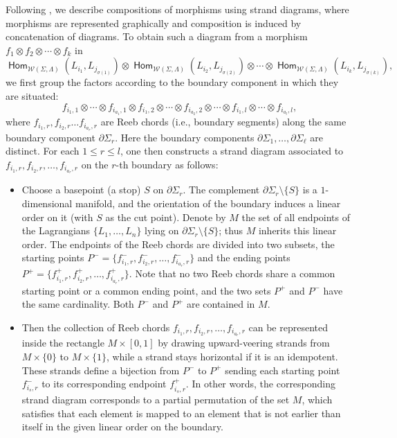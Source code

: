 \documentclass[a4paper, reqno, 11pt]{amsart}
\theoremstyle{definition}
\newcommand{\opname}[1]{\operatorname{\mathsf{#1}}}
\newcommand{\Hom}{\opname{Hom}}
\newcommand{\Sym}{\opname{Sym}}
\begin{document}
	
	Following \cite{Lipshitz-Ozsvath-Thurston2018}, we describe compositions of morphisms using strand diagrams, where morphisms are represented graphically and composition is induced by concatenation of diagrams. To obtain such a diagram from a morphism $f_1\otimes f_2\otimes \cdots \otimes f_k$ in $$\Hom_{\mathcal{W}(\Sigma, \Lambda)}(L_{i_1},L_{j_{\sigma(1)}})\otimes \Hom_{\mathcal{W}(\Sigma, \Lambda)}(L_{i_2},L_{j_{\sigma(2)}})\otimes \cdots \otimes \Hom_{\mathcal{W}(\Sigma, \Lambda)}(L_{i_k},L_{j_{\sigma(k)}}),$$ we first group the factors according to the boundary component in which they are situated: 
	$$f_{i_1,1}\otimes \cdots \otimes f_{i_{a_1},1}\otimes f_{i_1,2}\otimes \cdots \otimes f_{i_{a_{2}},2}\otimes \cdots\otimes  f_{i_{1},l}\otimes \cdots \otimes f_{i_{a_l},l},$$ 
	where $f_{i_1,r}, f_{i_2,r}\dots f_{i_{a_r},r}$ are Reeb chords (i.e., boundary segments) along the same  boundary component $\partial \Sigma_{r}$. Here the boundary components $\partial \Sigma_{1}, \dots, \partial \Sigma_{\ell}$ are distinct.  For each $1\leq r \leq l$,  one then constructs a strand diagram associated to  $f_{i_1,r}, f_{i_2,r}, \dots,  f_{i_{a_r},r}$ on the $r$-th boundary as follows:
	\begin{itemize}[leftmargin=*, label=--]
		\item  Choose a basepoint (a stop) $S$ on $\partial \Sigma_{r}$. 
		The complement $\partial \Sigma_{r} \setminus \{S\}$ is a $1$-dimensional manifold, and 
		the orientation of the boundary induces a linear order on it (with $S$ as the cut point).
		Denote by $M$ the set of all endpoints of the Lagrangians $\{L_1, \dots, L_n\}$ lying on 
		$\partial \Sigma_r \setminus \{S\}$; thus $M$ inherits this linear order.
		The endpoints of the Reeb chords are divided into two subsets, 
		the starting points  $P^{-}=\{f_{i_1,r}^{-}, f_{i_2,r}^{-}, \dots,  f_{i_{a_r},r}^{-}\}$ 
		and the ending points $P^{+}=\{f_{i_1,r}^{+}, f_{i_2,r}^{+}, \dots,  f_{i_{a_r},r}^{+}\}$.
		Note that no two Reeb chords share a common starting point or a common ending point, 
		and the two sets $P^{+}$ and $P^{-}$ have the same cardinality. 
		Both $P^{-}$ and $P^{+}$ are contained in $M$.
		\item Then the collection of Reeb chords $f_{i_1,r}, f_{i_2,r}, \dots,  f_{i_{a_r},r}$ can be represented inside the rectangle $M\times [0,1]$ by drawing upward-veering strands from $M\times \{0\}$ to $M\times \{1\}$, while a strand stays horizontal if it is an idempotent. These strands define a bijection from $P^{-}$ to $P^{+}$ sending each starting point $f_{i_s,r}^{-}$ to its corresponding endpoint $f_{i_s,r}^{+}$. In other words, the corresponding strand diagram corresponds to a partial permutation of the set $M$, which satisfies that each element is mapped to an element that is not earlier than itself 
		in the given linear order on the boundary.
	\end{itemize}
	
\end{document}
